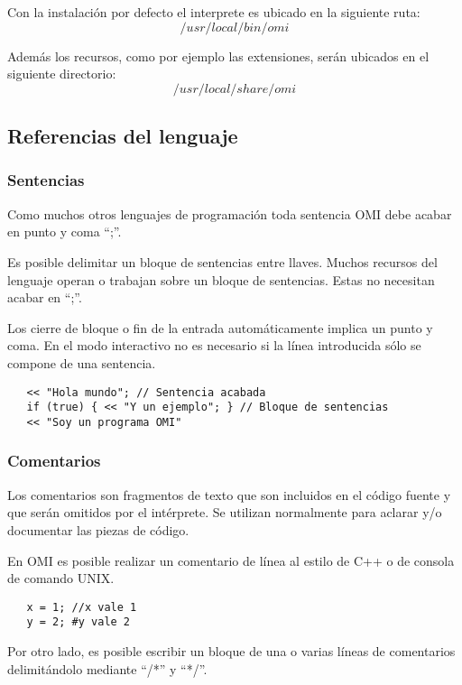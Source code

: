 Con la instalación por defecto el interprete es ubicado en la siguiente ruta:
$$/usr/local/bin/omi$$

Además los recursos, como por ejemplo las extensiones, serán ubicados en el siguiente directorio:
$$/usr/local/share/omi$$

\lstset {language=omi}
\subsection{Referencias del lenguaje}
\subsubsection{Sentencias} \label{sec:stmt}
Como muchos otros lenguajes de programación toda sentencia OMI debe acabar en punto y coma ``;''. 

Es posible delimitar un bloque de sentencias entre llaves. Muchos recursos del lenguaje operan 
 o trabajan sobre un bloque de sentencias. Estas no necesitan acabar en ``;''.

Los cierre de bloque o fin de la entrada automáticamente implica un punto y coma.
En el modo interactivo no es necesario si la línea introducida sólo se compone de una sentencia. \\

\begin{lstlisting}
   << "Hola mundo"; // Sentencia acabada 
   if (true) { << "Y un ejemplo"; } // Bloque de sentencias 
   << "Soy un programa OMI"
\end{lstlisting}

\subsubsection{Comentarios}\label{sec:comments}
Los comentarios son fragmentos de texto que son incluidos en el código fuente y que serán omitidos por el intérprete. Se utilizan normalmente para aclarar y/o documentar las
piezas de código. 

En OMI es posible realizar un comentario de línea al estilo de C++ o de consola de comando UNIX. \\

\begin{lstlisting}
   x = 1; //x vale 1
   y = 2; #y vale 2
\end{lstlisting}
 
Por otro lado, es posible escribir un bloque de una o varias líneas de comentarios delimitándolo mediante ``/*'' y ``*/''. \\

